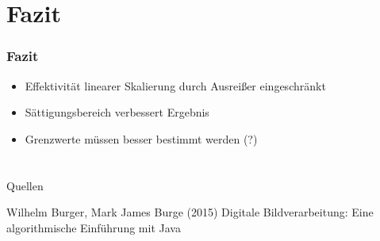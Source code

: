 \documentclass[14pt]{beamer}
\begin{document}
\section{Fazit}

\begin{frame}
	\frametitle{Fazit}
	\begin{itemize}
		\item Effektivität linearer Skalierung durch Ausreißer eingeschränkt
		\item Sättigungsbereich verbessert Ergebnis
		\item Grenzwerte müssen besser bestimmt werden	(?)	
	\end{itemize}
\end{frame}

\section*{}

\begin{frame}
	\Large{}	
	\newline
	\begin{block}{Quellen}
		\small{	
		\begin{thebibliography}{99} %
			 Wilhelm Burger, Mark James Burge (2015)
			\newblock Digitale Bildverarbeitung: Eine algorithmische Einführung mit Java
		\end{thebibliography}
		}
	\end{block}
\end{frame}
\end{document}

